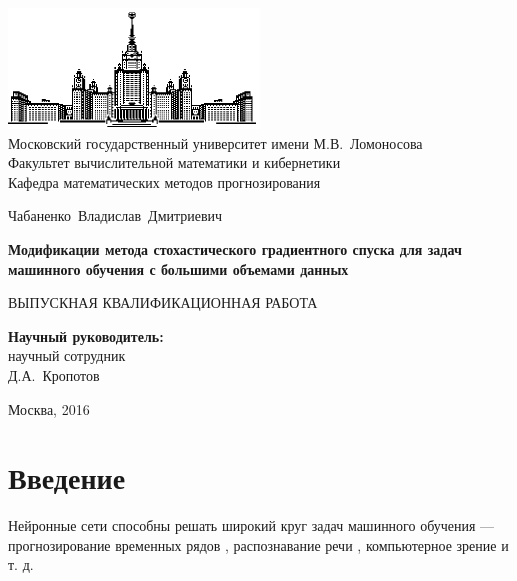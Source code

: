 \documentclass[12pt]{article}
\begin{document}
\thispagestyle{empty}

\begin{center}

\includegraphics[width=0.5\textwidth]{msu.eps}\\
{Московский государственный университет имени М.В.~Ломоносова}\\
Факультет вычислительной математики и кибернетики\\
Кафедра математических методов прогнозирования

\vspace{3cm}

{\Large Чабаненко~Владислав~Дмитриевич}

\vspace{1cm}

{\Large\bfseries Модификации метода стохастического градиентного спуска для задач машинного обучения с большими объемами данных
\\}

\vspace{1cm}

{\large ВЫПУСКНАЯ КВАЛИФИКАЦИОННАЯ РАБОТА}
\end{center}

\vfill

\begin{flushright}
  \textbf{Научный руководитель:}\\
  научный сотрудник\\
  Д.А.~Кропотов
\end{flushright}

\vfill

\begin{center}
Москва, 2016
\end{center}

\enlargethispage{3\baselineskip}

\newpage
\renewcommand{\contentsname}{Содержание}
\tableofcontents
\newpage

\section{Введение}


Нейронные сети способны решать широкий круг задач машинного обучения --- прогнозирование временных рядов \cite{time_series}, распознавание речи \cite{speech_recognition}, компьютерное зрение \cite{comp_vis} и т. д.
\end{document}
